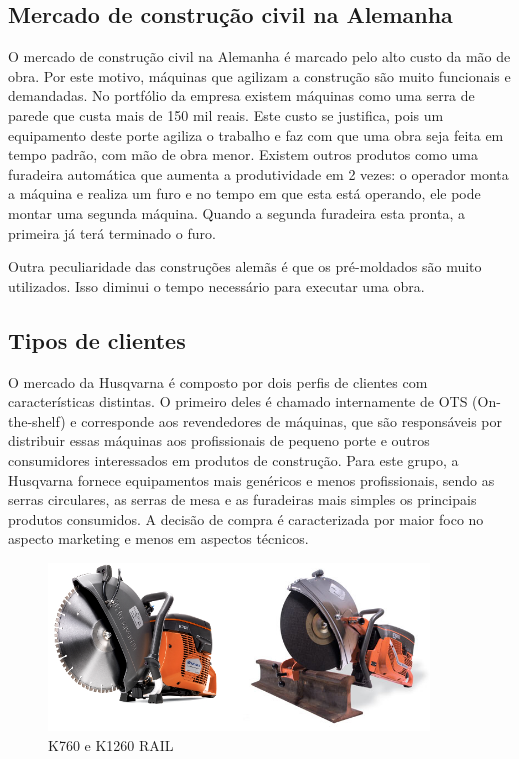 \documentclass[12pt]{article}
\begin{document}

\subsection{Mercado de construção civil na Alemanha}

	O mercado de construção civil na Alemanha é marcado pelo alto custo da mão de obra. Por este motivo, máquinas que agilizam a construção são muito funcionais e demandadas. No portfólio da empresa existem máquinas como uma serra de parede que custa mais de 150 mil reais. Este custo se justifica, pois um equipamento deste porte agiliza o trabalho e faz com que uma obra seja feita em tempo padrão, com mão de obra menor. Existem outros produtos como uma furadeira automática que aumenta a produtividade em 2 vezes: o operador monta a máquina e realiza um furo e no tempo em que esta está operando, ele pode montar uma segunda máquina. Quando a segunda furadeira esta pronta, a primeira já terá terminado o furo.

	Outra peculiaridade das construções alemãs é que os pré-moldados são muito utilizados. Isso diminui o tempo necessário para executar uma obra.

\subsection{Tipos de clientes}

	O mercado da Husqvarna é composto por dois perfis de clientes com características distintas. O primeiro deles é chamado internamente de OTS (On-the-shelf) e corresponde aos revendedores de máquinas, que são responsáveis por distribuir essas máquinas aos profissionais de pequeno porte e outros consumidores interessados em produtos de construção. Para este grupo, a Husqvarna fornece equipamentos mais genéricos e menos profissionais, sendo as serras circulares, as serras de mesa e as furadeiras mais simples os principais produtos consumidos. A decisão de compra é caracterizada por maior foco no aspecto marketing e menos em aspectos técnicos.

\begin{figure}[h!]
	\centering
	\includegraphics[width=0.9\textwidth]{img/k760-vs-k1260rail.png}
	\caption{K760 e K1260 RAIL}
	\label{fig:k700vsk1260}
\end{figure}
\end{document}
